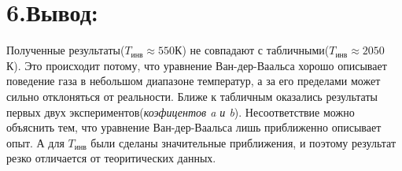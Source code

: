 \documentclass[a4paper,12pt]{article}
\theoremstyle{plain} %
\theoremstyle{definition} %
\theoremstyle{remark} %
\begin{document}
\section*{6.Вывод:}

\begin{flushleft}
Полученные результаты($T_{\text{инв}} \approx 550 К$) не совпадают с табличными($T_{\text{инв}} \approx 2050$ К). Это происходит потому, что уравнение Ван-дер-Ваальса хорошо описывает поведение газа в небольшом диапазоне температур, а за его пределами может сильно отклоняться от реальности. Ближе к табличным оказались результаты первых двух экспериментов(\textit{коэфицентов a и b}). Несоответствие можно объяснить тем, что уравнение Ван-дер-Ваальса лишь приближенно описывает опыт. А для $T_{\text{инв}}$ были сделаны значительные приближения, и поэтому результат резко отличается от теоритических данных.
\end{flushleft}
\end{document}
